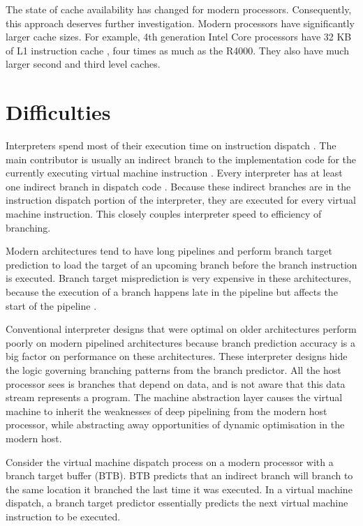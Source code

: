 		The state of cache availability has changed for modern processors. Consequently, this approach deserves further investigation. Modern processors have significantly larger cache sizes. For example, 4th generation Intel Core processors have 32 KB of L1 instruction cache \citep{optimisationreference}, four times as much as the R4000. They also have much larger second and third level caches.
		
	
		
	\section{Difficulties}
		Interpreters spend most of their execution time on instruction dispatch \citep{modernarchvm}. The main contributor is usually an indirect branch to the implementation code for the currently executing virtual machine instruction \citep{optimizingindirectbranch}. Every interpreter has at least one indirect branch in dispatch code \citep{modernarchvm}. Because these indirect branches are in the instruction dispatch portion of the interpreter, they are executed for every virtual machine instruction. This closely couples interpreter speed to efficiency of branching.
		
		Modern architectures tend to have long pipelines and perform branch target prediction to load the target of an upcoming branch before the branch instruction is executed. Branch target misprediction is very expensive in these architectures, because the execution of a branch happens late in the pipeline but affects the start of the pipeline \citep{optimizingindirectbranch}.
				
		Conventional interpreter designs that were optimal on older architectures perform poorly on modern pipelined architectures because branch prediction accuracy is a big factor on performance on these architectures. These interpreter designs hide the logic governing branching patterns from the branch predictor. All the host processor sees is branches that depend on data, and is not aware that this data stream represents a program. The machine abstraction layer causes the virtual machine to inherit the weaknesses of deep pipelining from the modern host processor, while abstracting away opportunities of dynamic optimisation in the modern host.
		
		Consider the virtual machine dispatch process on a modern processor with a branch target buffer (BTB). BTB predicts that an indirect branch will branch to the same location it branched the last time it was executed. In a virtual machine dispatch, a branch target predictor essentially predicts the next virtual machine instruction to be executed.
		

